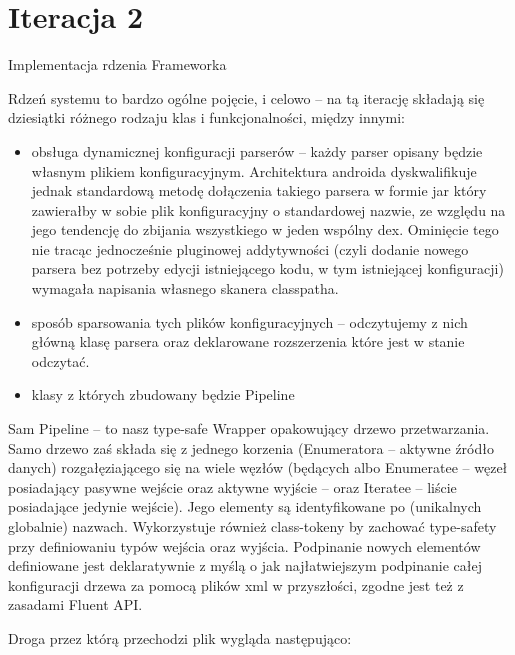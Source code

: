 \section{Iteracja 2}

\begin{Note}

	Implementacja rdzenia Frameworka


Rdzeń systemu to bardzo ogólne pojęcie, i celowo -- na tą iterację składają się dziesiątki różnego rodzaju klas i funkcjonalności, między innymi:

\begin{itemize}
    \item obsługa dynamicznej konfiguracji parserów --  każdy parser opisany będzie własnym plikiem konfiguracyjnym. Architektura androida dyskwalifikuje jednak standardową metodę dołączenia takiego parsera w formie jar który zawierałby w sobie plik konfiguracyjny o standardowej nazwie, ze względu na jego tendencję do zbijania wszystkiego w jeden wspólny dex. Ominięcie tego nie tracąc jednocześnie pluginowej addytywności (czyli dodanie nowego parsera bez potrzeby edycji istniejącego kodu, w tym istniejącej konfiguracji) wymagała napisania własnego skanera classpatha.
    \item sposób sparsowania tych plików konfiguracyjnych -- odczytujemy z nich główną klasę parsera oraz deklarowane rozszerzenia które jest w stanie odczytać.
    \item klasy z których zbudowany będzie Pipeline
\end{itemize}

Sam Pipeline -- to nasz type-safe Wrapper opakowujący drzewo przetwarzania. Samo drzewo zaś składa
się z jednego korzenia (Enumeratora -- aktywne źródło danych) rozgałęziającego się na wiele węzłów
(będących albo Enumeratee -- węzeł posiadający pasywne wejście oraz aktywne wyjście -- oraz Iteratee
-- liście posiadające jedynie wejście). Jego elementy są identyfikowane po (unikalnych globalnie) nazwach. Wykorzystuje również class-tokeny by zachować type-safety przy definiowaniu typów wejścia oraz wyjścia. Podpinanie nowych elementów definiowane jest deklaratywnie z myślą o jak najłatwiejszym podpinanie całej konfiguracji drzewa za pomocą plików xml w przyszłości, zgodne jest też z zasadami Fluent API.

Droga przez którą przechodzi plik wygląda następująco:


\end{Note}
